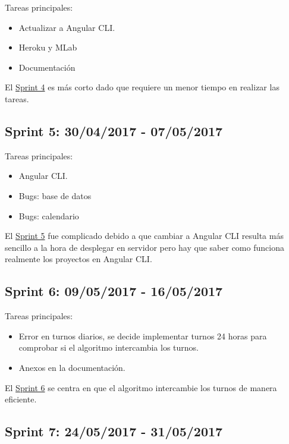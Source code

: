 Tareas principales:

\begin{itemize}
	\item Actualizar a Angular CLI.
	\item Heroku y MLab
	\item Documentación
\end{itemize}


El \underline{Sprint 4} es más corto dado que requiere un menor tiempo en realizar las tareas.

\subsection{Sprint 5: 30/04/2017 - 07/05/2017}\label{sprint5}

Tareas principales:

\begin{itemize}
	\item Angular CLI.
	\item Bugs: base de datos 
	\item Bugs: calendario
\end{itemize}


El \underline{Sprint 5} fue complicado debido a que cambiar a Angular CLI resulta más sencillo a la hora de desplegar en servidor pero hay que saber como funciona realmente los proyectos en Angular CLI.

\subsection{Sprint 6: 09/05/2017 - 16/05/2017}\label{sprint6}

Tareas principales:

\begin{itemize}
	
		\item Error en turnos diarios, se decide implementar turnos 24 horas para comprobar si el algoritmo intercambia los turnos.
	\item Anexos en la documentación.
\end{itemize}


El \underline{Sprint 6} se centra en que el algoritmo intercambie los turnos de manera eficiente. 

\subsection{Sprint 7: 24/05/2017 - 31/05/2017}\label{sprint7}

